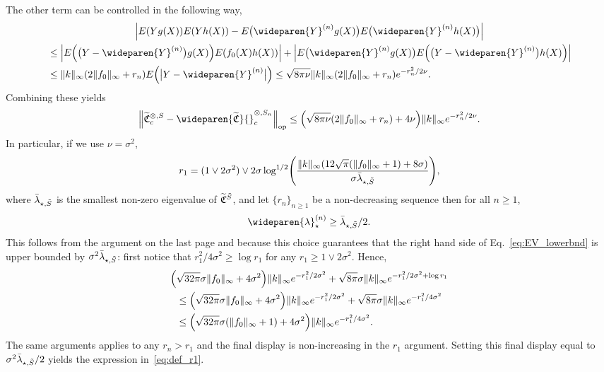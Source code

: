 \documentclass[AHL,Unicode,longabstracts,published]{cedram}
\theoremstyle{remark}
\DeclareMathOperator{\opp}{op}
\newcommand{\fkC}{\mathfrak{C}}
\newcommand{\Cov}{\tilde{\fkC}}
\newcommand{\CovCapn}{\wideparen{\widetilde{\fkC}}{\vphantom{\fkC}}^{\otimes,S_n}_c}
\let\oldtilde\tilde
\renewcommand*{\tilde}[1]{\mathchoice{\widetilde{#1}}{\widetilde{#1}}{\oldtilde{#1}}{\oldtilde{#1}}}
\let\originalleft\left
\let\originalright\right
\renewcommand{\left}{\mathopen{}\mathclose\bgroup\originalleft}
\renewcommand{\right}{\aftergroup\egroup\originalright}
\begin{document}
The other term can be controlled in the following way,
\begin{multline*}
\left|E(Y g(X)) E(Y h(X)) - E\bigl(\wideparen{Y}^{(n)} g(X)\bigr) E\bigl(\wideparen{Y}^{(n)} h(X)\bigr)\right| \\
\begin{aligned}
&\leq\left| E\left(\bigl(Y - \wideparen{Y}^{(n)}\bigr) g(X)\right) E(f_0(X) h(X))\right| + \left|E\bigl(\wideparen{Y}^{(n)} g(X)\bigr) E\left(\bigl(Y - \wideparen{Y}^{(n)}\bigr) h(X)\right)\right| \\
&\leq \|k\|_\infty (2 \|f_0\|_\infty + r_n) E\left(\bigl|Y - \wideparen{Y}^{(n)}\bigr|\right) \leq \sqrt{8 \pi \nu} \|k\|_\infty (2\|f_0\|_\infty + r_n) e^{-r_n^2/2\nu}.
\end{aligned}
\end{multline*}
Combining these yields
\begin{equation}\label{eq:EV_lowerbnd}
\left\| \tilde{\fkC}^{\otimes,S}_c - \CovCapn \right\|_{\opp} \leq \left(\sqrt{8 \pi \nu} (2\|f_0\|_\infty + r_n) + 4 \nu\right) \|k\|_\infty e^{-r_n^2/2\nu}.
\end{equation}
In particular, if we use $\nu = \sigma^2$,
\begin{equation}\label{eq:def_r1}
r_1 = (1 \vee 2 \sigma^2) \vee 2 \sigma \log^{1/2} \left(
\frac{ \|k\|_\infty \left(12 \sqrt{\pi} (\|f_0\|_\infty + 1) + 8 \sigma\right) }{\sigma \bar \lambda_{\star,\tilde S}}
\right),
\end{equation}
where $\bar \lambda_{\star,\tilde S}$ is the smallest non-zero eigenvalue of $\Cov^{\tilde S}$, and let $\{r_n\}_{n\geq 1}$ be a non-decreasing sequence then for all $n \geq 1$,
\[
\wideparen{\lambda}_\star^{(n)} \geq \bar \lambda_{\star,\tilde S} /2.
\]
This follows from the argument on the last page and because this choice guarantees that the right hand side of Eq.~\eqref{eq:EV_lowerbnd} is upper bounded by $\sigma^2 \bar \lambda_{\star,\tilde S}$: first notice that $r_1^2/4 \sigma^2 \geq \log r_1$ for any $r_1 \geq 1 \vee 2 \sigma^2$. Hence,
\begin{multline*}
\left(\sqrt{32 \pi} \sigma \|f_0\|_\infty + 4 \sigma^2\right) \|k\|_\infty e^{-r_1^2/2\sigma^2} + \sqrt{8 \pi} \sigma \|k\|_\infty e^{-r_1^2 / 2\sigma^2 + \log r_1} \\
\begin{aligned}
&\leq \left(\sqrt{32 \pi} \sigma \|f_0\|_\infty + 4 \sigma^2\right) \|k\|_\infty e^{-r_1^2/2\sigma^2} + \sqrt{8 \pi} \sigma \|k\|_\infty e^{-r_1^2 / 4\sigma^2} \\
&\leq \left(\sqrt{32 \pi} \sigma (\|f_0\|_\infty +1) + 4 \sigma^2\right) \|k\|_\infty e^{-r_1^2/4\sigma^2}.
\end{aligned}
\end{multline*}
The same arguments applies to any $r_n > r_1$ and the final display is non-increasing in the $r_1$ argument. Setting this final display equal to $\sigma^2 \bar \lambda_{\star,\tilde S} /2$ yields the expression in~\eqref{eq:def_r1}.
\end{document}
